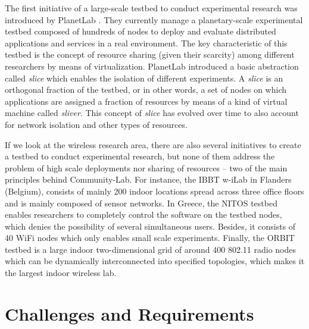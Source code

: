 \documentclass[conference]{IEEEtran}
\begin{document}
The first initiative of a large-scale testbed to conduct experimental research was introduced by PlanetLab \cite{planetlab}.
They currently manage a planetary-scale experimental testbed composed of hundreds of nodes to deploy and
evaluate distributed applications and services in a real environment. The key characteristic of this
testbed is the concept of resource sharing (given their scarcity) among different researchers by means of
virtualization. PlanetLab introduced a basic abstraction called \textit{slice} which enables the isolation
of different experiments. A \textit{slice} is an orthogonal fraction 
of the testbed, or in other words, a set of nodes on which applications are assigned a fraction of resources by means of a
kind of virtual machine called \textit{sliver}. This concept of \textit{slice} has evolved over time to also
account for network isolation and other types of resources.

If we look at the wireless research area, there are also several initiatives to create a testbed to conduct
experimental research, but none of them address the problem of high scale deployments nor sharing of resources -- two
of the main principles behind Community-Lab. For instance, the IBBT w-iLab \cite{ibbt} in Flanders (Belgium), 
consists of mainly 200 indoor locations spread across three office floors and is mainly composed of sensor networks. In
Greece, the NITOS \cite{nitos} testbed enables researchers to completely control the software on the testbed nodes, which denies 
the possibility of several simultaneous users. Besides, it consists of 40 WiFi nodes which only enables 
small scale experiments. Finally, the ORBIT testbed \cite{orbit} is a large
indoor two-dimensional grid of around 400 802.11 radio nodes which can be dynamically interconnected
into specified topologies, which makes it the largest indoor wireless lab.


\section{Challenges and Requirements}


\end{document}
